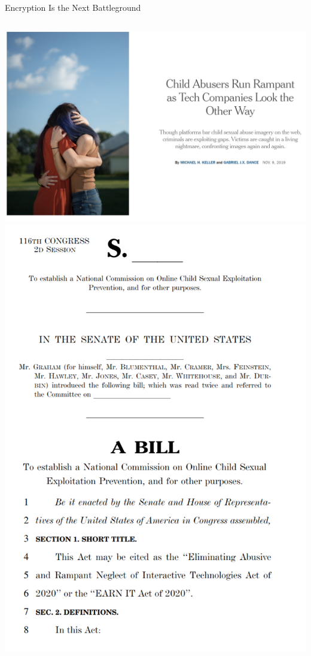 \documentclass[nobackground,dvipsnames,table,aspectratio=169]{beamer}
\begin{document}
\begin{frame}{Encryption Is the Next Battleground}
    \begin{columns}
            \includegraphics[width=\textwidth]{encryption-battleground-nyt}
            \includegraphics[width=\textwidth]{encryption-battleground-earn-it}
    \end{columns}
\end{frame}
\end{document}
